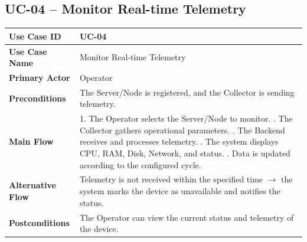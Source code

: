 \vspace{1.5em}

\subsection*{UC-04 -- Monitor Real-time Telemetry}
\noindent
\begin{tabularx}{\textwidth}{|>{\bfseries}p{3.2cm}|X|}
\hline
Use Case ID & UC-04 \\ \hline
Use Case Name & Monitor Real-time Telemetry \\ \hline
Primary Actor & Operator \\ \hline
Preconditions & The Server/Node is registered, and the Collector is sending telemetry. \\ \hline
Main Flow & 1. The Operator selects the Server/Node to monitor. \newline
2. The Collector gathers operational parameters. \newline
3. The Backend receives and processes telemetry. \newline
4. The system displays CPU, RAM, Disk, Network, and status. \newline
5. Data is updated according to the configured cycle. \\ \hline
Alternative Flow & Telemetry is not received within the specified time $\rightarrow$ the system marks the device as unavailable and notifies the status. \\ \hline
Postconditions & The Operator can view the current status and telemetry of the device. \\ \hline
\end{tabularx}

\vspace{1.5em}

